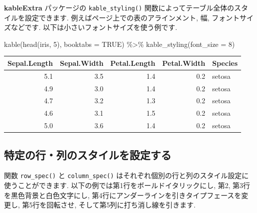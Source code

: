 \documentclass[
  11pt,
  lualatex,ja=standard,jafont=noto]{bxjsreport}
\newenvironment{Shaded}{\begin{snugshade}}{\end{snugshade}}
\newcommand{\AttributeTok}[1]{\textcolor[rgb]{0.77,0.63,0.00}{#1}}
\newcommand{\ConstantTok}[1]{\textcolor[rgb]{0.00,0.00,0.00}{#1}}
\newcommand{\DecValTok}[1]{\textcolor[rgb]{0.00,0.00,0.81}{#1}}
\newcommand{\FunctionTok}[1]{\textcolor[rgb]{0.00,0.00,0.00}{#1}}
\newcommand{\NormalTok}[1]{#1}
\newcommand{\SpecialCharTok}[1]{\textcolor[rgb]{0.00,0.00,0.00}{#1}}
\begin{document}
\textbf{kableExtra} パッケージの \texttt{kable\_styling()} 関数によってテーブル全体のスタイルを設定できます. 例えばページ上での表のアラインメント, 幅, フォントサイズなどです. 以下は小さいフォントサイズを使う例です.

\begin{Shaded}
\begin{Highlighting}[numbers=left,,]
\FunctionTok{kable}\NormalTok{(}\FunctionTok{head}\NormalTok{(iris, }\DecValTok{5}\NormalTok{), }\AttributeTok{booktabs =} \ConstantTok{TRUE}\NormalTok{) }\SpecialCharTok{\%\textgreater{}\%}
  \FunctionTok{kable\_styling}\NormalTok{(}\AttributeTok{font\_size =} \DecValTok{8}\NormalTok{)}
\end{Highlighting}
\end{Shaded}

\begin{table}
\centering\begingroup\fontsize{8}{10}\selectfont

\begin{tabular}{rrrrl}
\toprule
Sepal.Length & Sepal.Width & Petal.Length & Petal.Width & Species\\
\midrule
5.1 & 3.5 & 1.4 & 0.2 & setosa\\
4.9 & 3.0 & 1.4 & 0.2 & setosa\\
4.7 & 3.2 & 1.3 & 0.2 & setosa\\
4.6 & 3.1 & 1.5 & 0.2 & setosa\\
5.0 & 3.6 & 1.4 & 0.2 & setosa\\
\bottomrule
\end{tabular}
\endgroup{}
\end{table}

\hypertarget{style-specific-rows-columns}{%
\subsection{特定の行・列のスタイルを設定する}\label{style-specific-rows-columns}}

関数 \texttt{row\_spec()} と \texttt{column\_spec()} はそれぞれ個別の行と列のスタイル設定に使うことができます. 以下の例では第1行をボールドイタリックにし, 第2, 第3行を黒色背景と白色文字にし, 第4行にアンダーラインを引きタイプフェースを変更し, 第5行を回転させ, そして第5列に打ち消し線を引きます.
\end{document}
